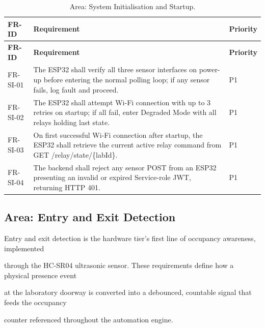 \begin{longtable}{|L{2.0cm}|L{12.0cm}|L{1.5cm}|}
	\caption{Area: System Initialisation and Startup.} \label{tab:3-7}                                                                                                                       \\
	\hline
	\textbf{FR-ID} & \textbf{Requirement}                                                                                                                                & \textbf{Priority} \\
	\hline
	\endfirsthead
	\hline
	\textbf{FR-ID} & \textbf{Requirement}                                                                                                                                & \textbf{Priority} \\
	\hline
	\endhead
	\hline
	\endfoot
	\hline
	\endlastfoot
	FR-SI-01       & The ESP32 shall verify all three sensor interfaces on power-up before entering the normal polling loop; if any sensor fails, log fault and proceed. & P1                \\
	\hline
	FR-SI-02       & The ESP32 shall attempt Wi-Fi connection with up to 3 retries on startup; if all fail, enter Degraded Mode with all relays holding last state.      & P1                \\
	\hline
	FR-SI-03       & On first successful Wi-Fi connection after startup, the ESP32 shall retrieve the current active relay command from GET /relay/state/\{labId\}.      & P1                \\
	\hline
	FR-SI-04       & The backend shall reject any sensor POST from an ESP32 presenting an invalid or expired Service-role JWT, returning HTTP 401.                       & P1                \\
	\hline
\end{longtable}


\subsection{Area: Entry and Exit Detection}
Entry and exit detection is the hardware tier's first line of occupancy awareness, implemented

through the HC-SR04 ultrasonic sensor. These requirements define how a physical presence event

at the laboratory doorway is converted into a debounced, countable signal that feeds the occupancy

counter referenced throughout the automation engine.

